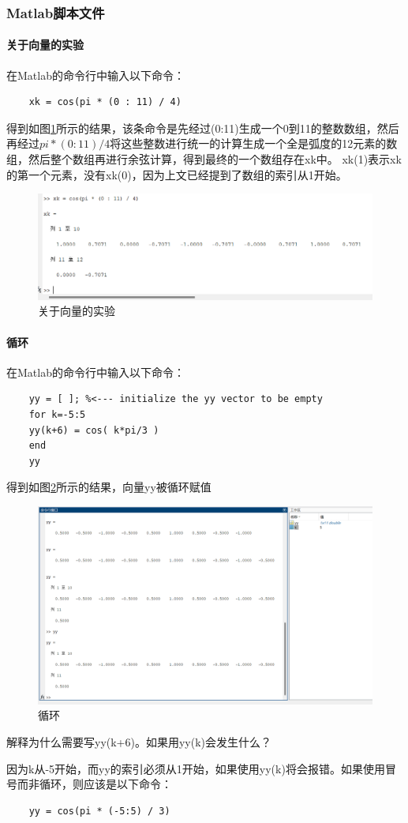\documentclass[UTF8]{ctexart}
\begin{document}
\subsubsection{Matlab脚本文件}
\paragraph{关于向量的实验}
在Matlab的命令行中输入以下命令：
\begin{verbatim}
    xk = cos(pi * (0 : 11) / 4)
\end{verbatim}
得到如图\ref{img:vector_lab}所示的结果，该条命令是先经过(0:11)生成一个0到11的整数数组，然后再经过$pi * (0:11) / 4$将这些整数进行统一的计算生成一个全是弧度的12元素的数组，然后整个数组再进行余弦计算，得到最终的一个数组存在xk中。
xk(1)表示xk的第一个元素，没有xk(0)，因为上文已经提到了数组的索引从1开始。
\begin{figure}[htbp]
    \centering
    \includegraphics[width=0.7\linewidth]{vector_lab.png}
    \caption{关于向量的实验}
    \label{img:vector_lab}
\end{figure}
\paragraph{循环}
在Matlab的命令行中输入以下命令：
\begin{verbatim}
    yy = [ ]; %<--- initialize the yy vector to be empty 
    for k=-5:5 
    yy(k+6) = cos( k*pi/3 ) 
    end 
    yy 
\end{verbatim}
得到如图\ref{img:loop}所示的结果，向量yy被循环赋值
\begin{figure}[htbp]
    \centering
    \includegraphics[width=0.7\linewidth]{loop.png}
    \caption{循环}
    \label{img:loop}
\end{figure}
\begin{framed}
    解释为什么需要写yy(k+6)。如果用yy(k)会发生什么？
\end{framed}
因为k从-5开始，而yy的索引必须从1开始，如果使用yy(k)将会报错。如果使用冒号而非循环，则应该是以下命令：
\begin{verbatim}
    yy = cos(pi * (-5:5) / 3)
\end{verbatim}
\end{document}
